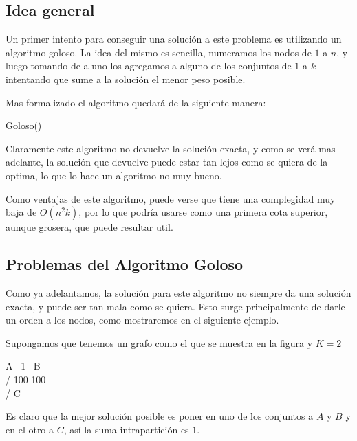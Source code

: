 \subsection{Idea general}

Un primer intento para conseguir una solución a este problema es utilizando un algoritmo goloso. La idea del mismo es sencilla, numeramos los nodos de $1$ a $n$, y luego tomando de a uno los agregamos a alguno de los conjuntos de $1$ a $k$ intentando que sume a la solución el menor peso posible.

Mas formalizado el algoritmo quedará de la siguiente manera:


\begin{algorithm}
  \begin{algorithmic}[1]\parskip=1mm
 \caption{ Goloso()}
 		\STATE{\quad\quad }
 		\STATE{\quad\quad }
		\STATE{\quad\quad }
		\STATE{}   
		\STATE{}
  \end{algorithmic}
  \end{algorithm}


Claramente este algoritmo no devuelve la solución exacta, y como se verá mas adelante, la solución que devuelve puede estar tan lejos como se quiera de la optima, lo que lo hace un algoritmo no muy bueno.

Como ventajas de este algoritmo, puede verse que tiene una complegidad muy baja de $O(n^2 k)$, por lo que podría usarse como una primera cota superior, aunque grosera, que puede resultar util.


\subsection{Problemas del Algoritmo Goloso}

Como ya adelantamos, la solución para este algoritmo no siempre da una solución exacta, y puede ser tan mala como se quiera. Esto surge principalmente de darle un orden a los nodos, como mostraremos en el siguiente ejemplo.

Supongamos que tenemos un grafo como el que se muestra en la figura y $K = 2$


A --1-- B
 \\    /
 100  100
  \\  /
    C

Es claro que la mejor solución posible es poner en uno de los conjuntos a $A$ y $B$ y en el otro a $C$, así la suma intrapartición es $1$.

